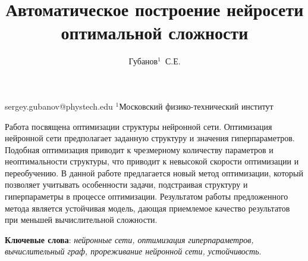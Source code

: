 \documentclass[12pt,twoside]{article}
\begin{document}
\title
    {Автоматическое построение нейросети оптимальной сложности}
\author
    {Губанов$^1$~С.Е.} %
\email
    {sergey.gubanov@phystech.edu}
\organization
    {$^1$Московский физико-технический институт}
\abstract
	{Работа посвящена оптимизации структуры нейронной сети. Оптимизация нейронной сети предполагает заданную структуру и значения гиперпараметров. Подобная оптимизация приводит к чрезмерному количеству параметров и неоптимальности структуры, что приводит к невысокой скорости оптимизации и переобучению. В данной работе предлагается новый метод оптимизации, который позволяет учитывать особенности задачи, подстраивая структуру и гиперпараметры в процессе оптимизации. Результатом работы предложенного метода является устойчивая модель, дающая приемлемое качество результатов при меньшей вычислительной сложности.
		
\bigskip
\textbf{Ключевые слова}: \emph {нейронные сети, оптимизация гиперпараметров, вычислительный граф, прореживание нейронной сети, устойчивость}.

}
\maketitle



\end{document}

